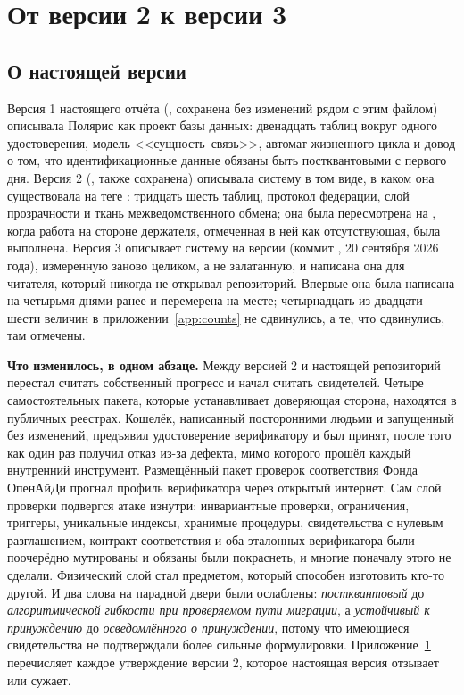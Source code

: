 \section{От версии 2 к версии 3}
\label{app:from-v2}

\subsection*{О настоящей версии}

Версия 1 настоящего отчёта (, сохранена без изменений рядом с
этим файлом) описывала Полярис как проект базы данных: двенадцать таблиц вокруг одного
удостоверения, модель <<сущность--связь>>, автомат жизненного цикла и довод о том, что
идентификационные данные обязаны быть постквантовыми с первого дня. Версия 2
(, также сохранена) описывала систему в том виде, в каком
она существовала на теге : тридцать шесть таблиц, протокол федерации, слой
прозрачности и ткань межведомственного обмена; она была пересмотрена на , когда
работа на стороне держателя, отмеченная в ней как отсутствующая, была выполнена. Версия 3
описывает систему на версии  (коммит , 20 сентября 2026 года),
измеренную заново целиком, а не залатанную, и написана она для читателя, который никогда не
открывал репозиторий. Впервые она была написана на  четырьмя днями ранее и
перемерена на месте; четырнадцать из двадцати шести величин в приложении~\ref{app:counts} не
сдвинулись, а те, что сдвинулись, там отмечены.



\textbf{Что изменилось, в одном абзаце.} Между версией 2 и настоящей репозиторий перестал
считать собственный прогресс и начал считать свидетелей. Четыре самостоятельных пакета, которые
устанавливает доверяющая сторона, находятся в публичных реестрах. Кошелёк, написанный
посторонними людьми и запущенный без изменений, предъявил удостоверение верификатору и был
принят, после того как один раз получил отказ из-за дефекта, мимо которого прошёл каждый
внутренний инструмент. Размещённый пакет проверок соответствия Фонда ОпенАйДи прогнал профиль
верификатора через открытый интернет. Сам слой проверки подвергся атаке изнутри: инвариантные
проверки, ограничения, триггеры, уникальные индексы, хранимые процедуры, свидетельства с нулевым
разглашением, контракт соответствия и оба эталонных верификатора были поочерёдно мутированы и
обязаны были покраснеть, и многие поначалу этого не сделали. Физический слой стал предметом,
который способен изготовить кто-то другой. И два слова на парадной двери были ослаблены:
\emph{постквантовый} до \emph{алгоритмической гибкости при проверяемом пути миграции}, а
\emph{устойчивый к принуждению} до \emph{осведомлённого о принуждении}, потому что имеющиеся
свидетельства не подтверждали более сильные формулировки. Приложение~\ref{app:from-v2}
перечисляет каждое утверждение версии 2, которое настоящая версия отзывает или сужает.

